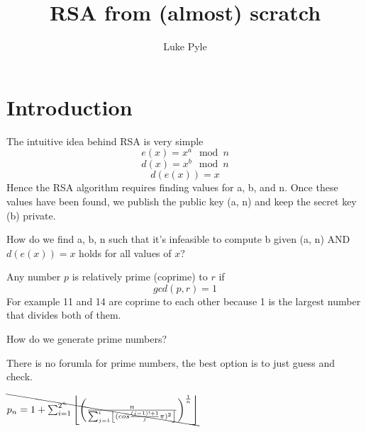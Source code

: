 \documentclass[aspectratio=169]{beamer}
\title[My Talk] %
{RSA from (almost) scratch} %
\author{Luke Pyle}
\date[28th March 2025]  %
\begin{document}
\begin{frame}[plain]
  \titlepage
\end{frame}

\section{Introduction}


\begin{frame}
    \begin{center} 
        The intuitive idea behind RSA is very simple
        \[e(x) = x^a \mod n\]
        \[d(x) = x^b \mod n\]
        \[d(e(x)) = x\]
        \newline
        Hence the RSA algorithm requires finding values for a, b, and n.
        Once these values have been found, we publish the public key (a, n) and keep the secret key (b) private.
    \end{center}
\end{frame}

\begin{frame}
    \begin{center}
        How do we find a, b, n such that it's infeasible to compute b given (a, n) AND $d(e(x)) = x$ holds for all values of $x$?
    \end{center}
\end{frame}

\begin{frame}
    \begin{center}
        Any number $p$ is relatively prime (coprime) to $r$ if 
        \[gcd(p,r)=1\]
        For example 11 and 14 are coprime to each other because 1 is the largest number that divides both of them.
    \end{center}
\end{frame}

\begin{frame}
    \begin{center}
        How do we generate prime numbers?
    \end{center}
\end{frame}

\begin{frame}
    \begin{center}
        There is no forumla for prime numbers, the best option is to just guess and check.

        
        $\bcancel{p_{n} = 1 + \sum_{i=1}^{2^n} \left \lfloor \left(\frac{n}{\sum_{j=1}^{i}\left\lfloor (cos \frac{(j -1)! + 1}{j} \pi)^{2}\right\rfloor}\right)^{\frac{1}{n}} \right \rfloor}$
    \end{center}
\end{frame}
\end{document}
